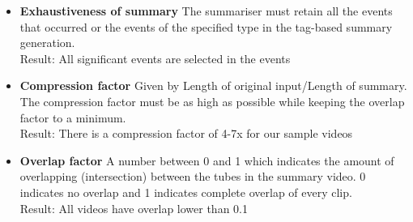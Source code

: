 \documentclass[conference]{IEEEtran}
\begin{document}
    \begin{itemize}
        \item \textbf{Exhaustiveness of summary}
        The summariser must retain all the events that occurred or the events
        of the specified type in the tag-based summary generation. \\
        Result: All significant events are selected in the events
        \item \textbf{Compression factor}
        Given by Length of original input/Length of summary. The compression
        factor must be as high as possible while keeping the overlap factor to
        a minimum. \\
        Result: There is a compression factor of 4-7x for our sample videos

        \begin{center}
        \end{center}


        \item \textbf{Overlap factor}
        A number between 0 and 1 which indicates the amount of overlapping
        (intersection) between the tubes in the summary video. 0 indicates no
        overlap and 1 indicates complete overlap of every clip. \\
        Result: All videos have overlap lower than 0.1
    \end{itemize}
\end{document}
